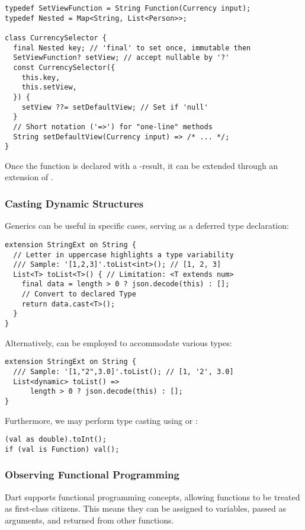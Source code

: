 \begin{lstlisting}
typedef SetViewFunction = String Function(Currency input);
typedef Nested = Map<String, List<Person>>;

class CurrencySelector {
  final Nested key; // 'final' to set once, immutable then
  SetViewFunction? setView; // accept nullable by '?'
  const CurrencySelector({
    this.key,
    this.setView,
  }) {
    setView ??= setDefaultView; // Set if 'null'
  }
  // Short notation ('=>') for "one-line" methods
  String setDefaultView(Currency input) => /* ... */;
}
\end{lstlisting}

\noindent Once the function is declared with a -result, it can be extended through an extension of
.


\subsubsection{Casting Dynamic Structures}

Generics can be useful in specific cases, serving as a deferred type declaration:

\begin{lstlisting}
extension StringExt on String {
  // Letter in uppercase highlights a type variability
  /// Sample: '[1,2,3]'.toList<int>(); // [1, 2, 3]
  List<T> toList<T>() { // Limitation: <T extends num>
    final data = length > 0 ? json.decode(this) : [];
    // Convert to declared Type
    return data.cast<T>();
  }
}
\end{lstlisting}

\noindent Alternatively,  can be employed to accommodate various types:

\begin{lstlisting}
extension StringExt on String {
  /// Sample: '[1,"2",3.0]'.toList(); // [1, '2', 3.0]
  List<dynamic> toList() =>
      length > 0 ? json.decode(this) : [];
}
\end{lstlisting}

\noindent Furthermore, we may perform type casting using  or :

\begin{lstlisting}
(val as double).toInt();
if (val is Function) val();
\end{lstlisting}


\subsubsection{Observing Functional Programming}
Dart supports functional programming concepts, allowing functions to be treated as first-class citizens.
This means they can be assigned to variables, passed as arguments, and returned from other functions.

